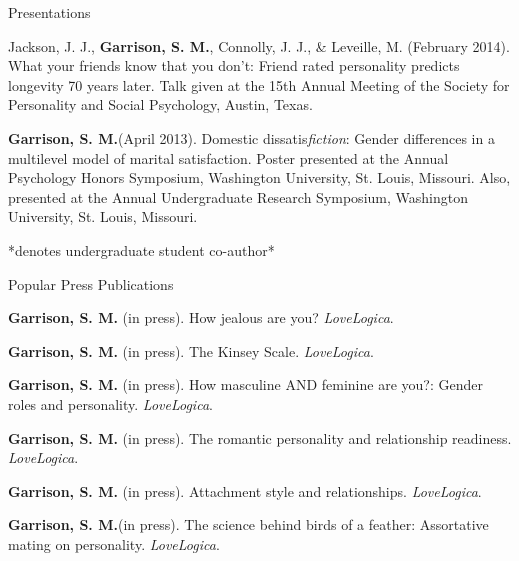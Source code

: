 \documentclass {resume}
\newcommand{\meb}{{\bf Garrison, S. M.}\xspace}
\newlength{\wideitemsep}
\let\olditem\item
\renewcommand{\item}{\setlength{\itemsep}{\wideitemsep}\olditem}
\begin{document}
\begin{rSection}{\textrm{Presentations}}
\begin{etaremune}
\item\begin{samepage}Jackson, J. J., \textbf{Garrison, S. M.}, Connolly, J. J., \& Leveille, M. (February 2014). What your friends know that you don't: Friend rated personality predicts longevity 70 years later. Talk given at the 15th Annual Meeting of the Society for Personality and  Social Psychology, Austin, Texas.\end{samepage}
\item\begin{samepage}\meb (April 2013). Domestic dissatis{\em fiction}: Gender differences in a multilevel model of marital satisfaction. Poster presented at the Annual Psychology Honors Symposium, Washington  University, St. Louis, Missouri. Also, presented at the Annual Undergraduate Research Symposium, Washington University, St. Louis, Missouri.\end{samepage}
\end{etaremune}\vspace{-3mm}\begin{center}\footnotesize{*denotes undergraduate student co-author*}\end{center} \vspace{-3mm}%
\end{rSection}
\pagestyle{myheadings}
\begin{samepage}\begin{rSection}{\textrm{Popular Press Publications}} \begin{etaremune}
\item\textbf{Garrison, S. M.} (in press). How jealous are you? \textit{LoveLogica}.
\item\textbf{Garrison, S. M.} (in press). The Kinsey Scale. \textit{LoveLogica}.%
\item\textbf{Garrison, S. M.} (in press). How masculine AND feminine are you?: Gender roles and personality. \textit{LoveLogica}.
\item\textbf{Garrison, S. M.} (in press). %
The romantic personality and relationship readiness. \textit{LoveLogica}.
\item\textbf{Garrison, S. M.} (in press). Attachment style and relationships. \textit{LoveLogica}.
\item\meb(in press). The science behind birds of a feather: Assortative mating on personality. \textit{LoveLogica}.
\end{etaremune}\end{rSection}\end{samepage}
\end{document}
